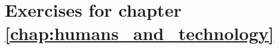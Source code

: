 \chapter{Exercises for chapter \ref{chap:humans_and_technology}} \label{chap:humans_and_technology_exercises}


